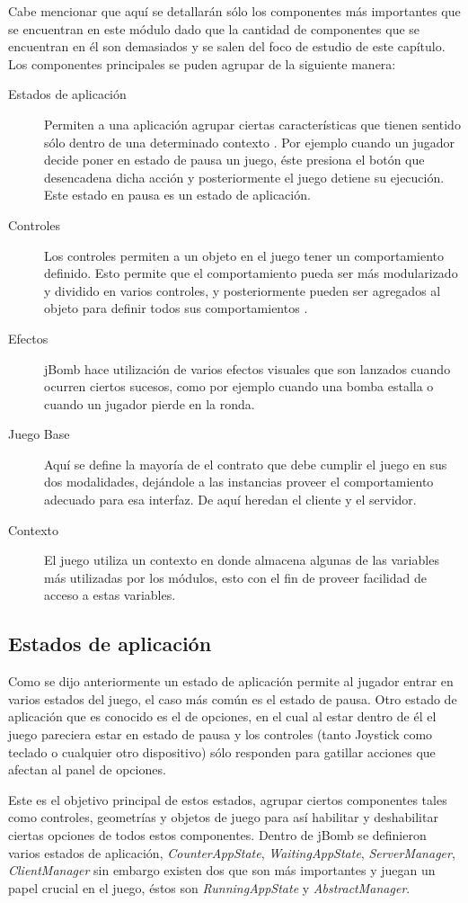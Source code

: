 \documentclass[a4paper,12pt,openany,oneside]{book}
\begin{document}
Cabe mencionar que aquí se detallarán sólo los componentes más importantes que se encuentran en este módulo dado que la cantidad de componentes que se encuentran en él son demasiados y se salen del foco de estudio de este capítulo. Los componentes principales se puden agrupar de la siguiente manera:
\begin{description}
\item[Estados de aplicación] Permiten a una aplicación agrupar ciertas características que tienen sentido sólo dentro de una determinado contexto \cite{BEGINNERS}. Por ejemplo cuando un jugador decide poner en estado de pausa un juego, éste presiona el botón que desencadena dicha acción y posteriormente el juego detiene su ejecución. Este estado en pausa es un estado de aplicación.
\item[Controles] Los controles permiten a un objeto en el juego tener un comportamiento definido. Esto permite que el comportamiento pueda ser más modularizado y dividido en varios controles, y posteriormente pueden ser agregados al objeto para definir todos sus comportamientos \cite{BEGINNERS}.
\item[Efectos] jBomb hace utilización de varios efectos visuales que son lanzados cuando ocurren ciertos sucesos, como por ejemplo cuando una bomba estalla o cuando un jugador pierde en la ronda\cite{BEGINNERS}.
\item[Juego Base] Aquí se define la mayoría de el contrato que debe cumplir el juego en sus dos modalidades, dejándole a las instancias proveer el comportamiento adecuado para esa interfaz. De aquí heredan el cliente y el servidor.
\item[Contexto] El juego utiliza un contexto en donde almacena algunas de las variables más utilizadas por los módulos, esto con el fin de proveer facilidad de acceso a estas variables.
\end{description}
\subsection{Estados de aplicación} Como se dijo anteriormente un estado de aplicación permite al jugador entrar en varios estados del juego, el caso más común es el estado de pausa. Otro estado de aplicación que es conocido es el de opciones, en el cual al estar dentro de él el juego pareciera estar en estado de pausa y los controles (tanto Joystick como teclado o cualquier otro dispositivo) sólo responden para gatillar acciones que afectan al panel de opciones.

Este es el objetivo principal de estos estados, agrupar ciertos componentes tales como controles, geometrías y objetos de juego para así habilitar y deshabilitar ciertas opciones de todos estos componentes. Dentro de jBomb se definieron varios estados de aplicación, \textit{CounterAppState}, \textit{WaitingAppState}, \textit{ServerManager}, \textit{ClientManager} sin embargo existen dos que son más importantes y juegan un papel crucial en el juego, éstos son \textit{RunningAppState} y \textit{AbstractManager}.
\end{document}
